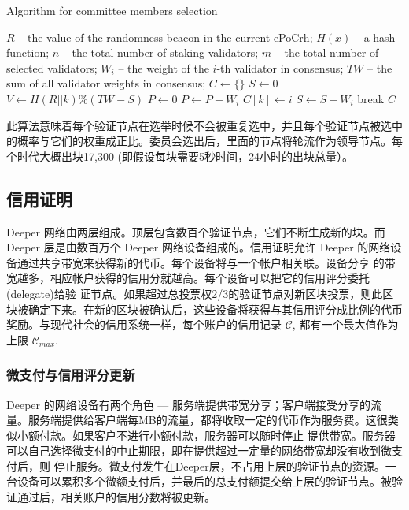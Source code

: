 \documentclass[a4paper]{article}
\begin{document}
\begin{algorithm} [hh]
\caption{Algorithm for committee members selection}
\label{alg:vdf-selection}
\begin{algorithmic} [1]
\State $R$ -- the value of the randomness beacon in the current ePoCrh;
\State $H(x)$ -- a hash function;
\State $n$ -- the total number of staking validators;
\State $m$ -- the total number of selected validators;
\State $W_i$ -- the weight of the $i$-th validator in consensus;
\State $TW$ -- the sum of all validator weights in consensus;
\State
\State $C \leftarrow \{\}$
\State $S \leftarrow 0$
    \State $V \leftarrow H(R||k) \% (TW-S)$
    \State $P \leftarrow 0$
        \State $P \leftarrow P + W_i$
            \State $C[k] \leftarrow i$
            \State $S \leftarrow S + W_i$
            \State break
        \EndIf
    \EndFor
\EndFor
\State \Return $C$
\end{algorithmic}
\end{algorithm}

此算法意味着每个验证节点在选举时候不会被重复选中，并且每个验证节点被选中的概率与它们的权重成正比。委员会选出后，里面的节点将轮流作为领导节点。每个时代大概出块17,300 (即假设每块需要5秒时间，24小时的出块总量）。

\subsection{信用证明}
Deeper 网络由两层组成。顶层包含数百个验证节点，它们不断生成新的块。而 Deeper 层是由数百万个 Deeper 网络设备组成的。信用证明允许 Deeper 的网络设备通过共享带宽来获得新的代币。每个设备将与一个帐户相关联。设备分享
的带宽越多，相应帐户获得的信用分就越高。每个设备可以把它的信用评分委托(delegate)给验
证节点。如果超过总投票权2/3的验证节点对新区块投票，则此区块被确定下来。在新的区块被确认后，这些设备将获得与其信用评分成比例的代币奖励。与现代社会的信用系统一样，每个账户的信用记录 $\mathcal{C}$, 都有一个最大值作为上限 $\mathcal{C}_{max}$.

\subsubsection{微支付与信用评分更新}
Deeper 的网络设备有两个角色 --- 服务端提供带宽分享；客户端接受分享的流量。服务端提供给客户端每MB的流量，都将收取一定的代币作为服务费。这很类似小额付款。如果客户不进行小额付款，服务器可以随时停止
提供带宽。服务器可以自己选择微支付的中止期限，即在提供超过一定量的网络带宽却没有收到微支付后，则
停止服务。微支付发生在Deeper层，不占用上层的验证节点的资源。一台设备可以累积多个微额支付后，并最后的总支付额提交给上层的验证节点。被验证通过后，相关账户的信用分数将被更新。
\end{document}
